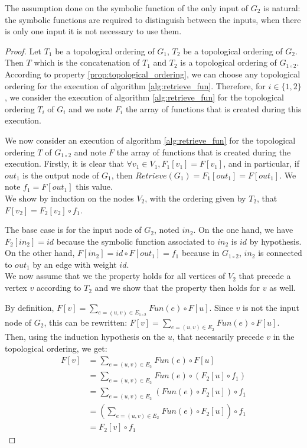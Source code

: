 \documentclass[11pt,a4paper]{article}
\newcommand{\Sum}[2]{\overset{#2}{\underset{#1}{\sum}}}
\theoremstyle{definition}
\begin{document}
	The assumption done on the symbolic function of the only input of $G_2$ is natural: the symbolic functions are required to distinguish between the inputs, when there is only one input it is not necessary to use them.
	
\begin{proof}

	Let $T_1$ be a topological ordering of $G_1$, $T_2$ be a topological ordering of $G_2$. Then $T$ which is the concatenation of $T_1$ and $T_2$ is a topological ordering of $G_{1 \circ 2}$. According to property \ref{prop:topological_ordering}, we can choose any topological ordering for the execution of algorithm \ref{alg:retrieve_fun}. Therefore, for $i \in \{ 1,2\}$, we consider the execution of algorithm \ref{alg:retrieve_fun} for the topological ordering $T_i$ of $G_i$ and we note $F_i$ the array of functions that is created during this execution.
	
	We now consider an execution of algorithm \ref{alg:retrieve_fun} for the topological ordering $T$ of $G_{1 \circ 2}$ and note $F$ the array of functions that is created during the execution. Firstly, it is clear that $\forall v_1 \in V_1, F_1[v_1]=F[v_1]$, and in particular, if $out_1$ is the output node of $G_1$, then $Retrieve(G_1)=F_1[out_1]=F[out_1]$. We note $f_1 = F[out_1]$ this value.\\
	
	We show by induction on the nodes $V_2$, with the ordering given by $T_2$, that $F[v_2]=F_2[v_2] \circ f_1$.
	
	The base case is for the input node of $G_2$, noted $in_2$. On the one hand, we have $F_2[in_2]=id$ because the symbolic function associated to $in_2$ is $id$ by hypothesis. On the other hand, $F[in_2]=id \circ F[out_1] = f_1$ because in $G_{1 \circ 2}$, $in_2$ is connected to $out_1$ by an edge with weight $id$.\\
	
	We now assume that we the property holds for all vertices of $V_2$ that precede a vertex $v$ according to $T_2$ and we show that the property then holds for $v$ as well.
	
	 By definition, $F[v] = \Sum{e=(u,v) \in E_{1 \circ 2}}{} Fun(e) \circ F[u]$. Since $v$ is not the input node of $G_2$, this can be rewritten: $F[v] = \Sum{e=(u,v) \in E_{2}}{} Fun(e) \circ F[u]$. Then, using the induction hypothesis on the $u$, that necessarily precede $v$ in the topological ordering, we get:
	 \begin{align*}
	 F[v] &= \Sum{e=(u,v) \in E_{2}}{} Fun(e) \circ F[u] \\
	 &= \Sum{e=(u,v) \in E_{2}}{} Fun(e) \circ (F_2[u] \circ f_1) \\
	 &= \Sum{e=(u,v) \in E_{2}}{} (Fun(e) \circ F_2[u]) \circ f_1 \\
	 &= (\Sum{e=(u,v) \in E_{2}}{} Fun(e) \circ F_2[u]) \circ f_1 \\
	 &= F_2[v] \circ f_1
	 \end{align*}
	

\end{proof}
\end{document}
